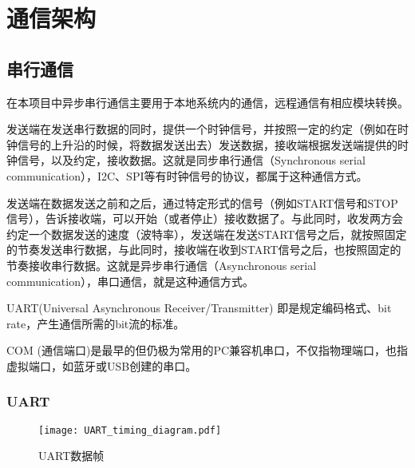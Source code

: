 \chapter{通信架构}
\label{cha:Communication}

\section{串行通信}

在本项目中异步串行通信主要用于本地系统内的通信，远程通信有相应模块转换。

发送端在发送串行数据的同时，提供一个时钟信号，并按照一定的约定（例如在时钟信号的上升沿的时候，将数据发送出去）发送数据，接收端根据发送端提供的时钟信号，以及约定，接收数据。这就是同步串行通信（Synchronous serial communication），I2C、SPI等有时钟信号的协议，都属于这种通信方式。

发送端在数据发送之前和之后，通过特定形式的信号（例如START信号和STOP信号），告诉接收端，可以开始（或者停止）接收数据了。与此同时，收发两方会约定一个数据发送的速度（波特率），发送端在发送START信号之后，就按照固定的节奏发送串行数据，与此同时，接收端在收到START信号之后，也按照固定的节奏接收串行数据。这就是异步串行通信（Asynchronous serial communication），串口通信，就是这种通信方式。

UART(Universal Asynchronous Receiver/Transmitter) 即是规定编码格式、bit rate，产生通信所需的bit流的标准。

COM (通信端口)是最早的但仍极为常用的PC兼容机串口，不仅指物理端口，也指虚拟端口，如蓝牙或USB创建的串口。

\subsection{UART}

\begin{figure}[htbp]
    \centering
    \texttt{[image: UART\_timing\_diagram.pdf]}
    \caption{UART数据帧}
    \label{fig:UART-Data-framing}
\end{figure}



